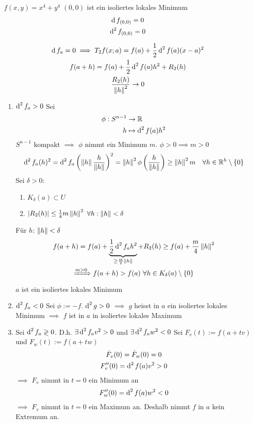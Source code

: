 \begin{Bsp}
  $f(x,y)=x^4+y^4$ $(0,0)$ ist ein isoliertes lokales Minimum
  \begin{gather*}
    \operatorname{d} f_{(0,0)}=0\\
    \operatorname{d}^2 f_{(0,0)}=0
  \end{gather*}
\end{Bsp}
\begin{Bew}
  \begin{gather*}
    \operatorname{d} f_a=0\implies T_2f(x;a)=f(a)+\frac{1}{2}\operatorname{d}^2f(a)(x-a)^2\\
    f(a+h)=f(a)+\frac{1}{2}\operatorname{d}^2f(a)h^2+R_2(h)\\
    \frac{R_2(h)}{\left\| h \right\|^2}\to 0
  \end{gather*}
  \begin{enumerate}
    \item $\operatorname{d} ^2f_a>0$ Sei
      \begin{align*}
        \phi:S^{n-1}&\to\mathbb{R}\\
        h&\mapsto\operatorname{d}^2f(a)h^2
      \end{align*}
      $S^{n-1}$ kompakt $\implies$ $\phi$ nimmt ein Minimum $m$. $\phi>0\implies m>0$
      \begin{align*}
        \operatorname{d}^2f_a(h)^2=\operatorname{d}^2f_a\left( \left\| h \right\|\frac{h}{\left\| h \right\|} \right)^2=\left\| h \right\|^2\phi\left( \frac{h}{\left\| h \right\|} \right)\geq \left\| h \right\|^2m &&\forall h\in\mathbb{R}^h\setminus\left\{ 0 \right\}
      \end{align*}
      Sei $\delta>0$:
      \begin{enumerate}
        \item $K_\delta(a)\subset U$
        \item $\left| R_2(h) \right|\leq \frac{1}{4}m\left\| h \right\|^2$ $\forall h:\left\| h \right\|<\delta$
      \end{enumerate}
      Für $h$: $\left\| h \right\|<\delta$
      \begin{gather*}
        f(a+h)=f(a)+\underbrace{\frac{1}{2}\operatorname{d}^2f_ah^2}_{\geq \frac{m}{2}\left\| h \right\|}+R_2(h)\geq f(a)+\frac{m}{4}\left\| h \right\|^2\\
        \xRightarrow{m>0} f(a+h)> f(a)\ \forall h\in K_\delta(a)\setminus\left\{ 0 \right\}
      \end{gather*}
      $a$ ist ein isoliertes lokales Minimum
    \item $\operatorname{d}^2f_a<0$ Sei $\phi:=-f$. $\operatorname{d}^2g>0$ $\implies$ $g$ heisst in $a$ ein isoliertes lokales Minimum $\implies$ $f$ ist in $a$ in isoliertes lokales Maximum
    \item Sei $\operatorname{d}^2f_a \gtrless 0$. D.h. $\exists \operatorname{d}^2 f_av^2>0$ und $\exists \operatorname{d}^2 f_aw^2<0$ Sei $F_v(t):=f(a+tv)$ und $F_w(t):=f(a+tw)$
      \begin{gather*}
        \dot F_v(0)=\dot F_w(0)=0\\
        F_v''(0)=\operatorname{d}^2f(a)v^2>0
      \end{gather*}
      $\implies$ $F_v$ nimmt in $t=0$ ein Minimum an
      \begin{gather*}
        F_w''(0)=\operatorname{d}^2f(a)w^2<0
      \end{gather*}
      $\implies$ $F_v$ nimmt in $t=0$ ein Maximum an. Deshalb nimmt $f$ in $a$ kein Extremum an.
  \end{enumerate}
\end{Bew}
